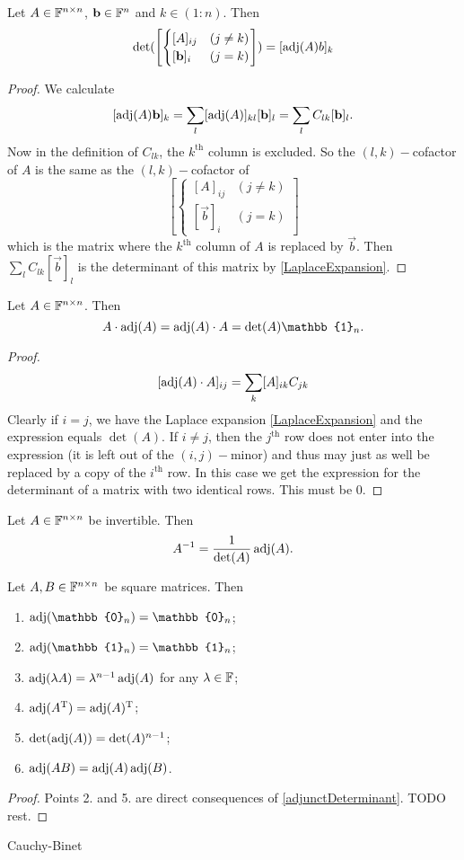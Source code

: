 \begin{lemma}
Let $A\in\mathbb{F}^{n\times n}$, $\boldsymbol{\mathrm{b}}\in \mathbb{F}^n$ and $k\in(1:n)$. Then
\[ \det(\left[\begin{cases}
[A]_{ij} & (j\neq k) \\
[\vec{b}]_i & (j=k)
\end{cases}\right]) = [\adj(A)b]_k \]
\end{lemma}
\begin{proof}
We calculate
\[ [\operatorname{adj}(A)\boldsymbol{\mathrm{b}}]_k = \sum_l [\operatorname{adj}(A)]_{kl}[\boldsymbol{\mathrm{b}}]_l = \sum_l C_{lk}[\boldsymbol{\mathrm{b}}]_l. \]
Now in the definition of $C_{lk}$, the $k^\text{th}$ column is excluded. So the $(l,k)-$cofactor of $A$ is the same as the $(l,k)-$cofactor of 
\[ \left[\begin{cases}
[A]_{ij} & (j\neq k) \\
[\vec{b}]_i & (j=k)
\end{cases}\right] \]
which is the matrix where the $k^\text{th}$ column of $A$ is replaced by $\vec{b}$. Then $\sum_l C_{lk}[\vec{b}]_l$ is the determinant of this matrix by \ref{LaplaceExpansion}.
\end{proof}

\begin{proposition} \label{adjunctDeterminant}
Let $A\in\mathbb{F}^{n\times n}$. Then
\[ A\cdot\adj(A) = \adj(A)\cdot A = \det(A) \mathbb{1}_n. \]
\end{proposition}
\begin{proof}
\[ [\operatorname{adj}(A)\cdot A]_{ij} = \sum_k [A]_{ik}C_{jk} \]
Clearly if $i=j$, we have the Laplace expansion \ref{LaplaceExpansion} and the expression equals $\det(A)$. If $i\neq j$, then the $j^\text{th}$ row does not enter into the expression (it is left out of the $(i,j)-$minor) and thus may just as well be replaced by a copy of the $i^\text{th}$ row. In this case we get the expression for the determinant of a matrix with two identical rows. This must be $0$.
\end{proof}
\begin{corollary}
Let $A\in\mathbb{F}^{n\times n}$ be invertible. Then
\[ A^{-1} = \frac{1}{\det(A)}\operatorname{adj}(A). \]
\end{corollary}

\begin{proposition}
Let $A,B\in\mathbb{F}^{n\times n}$ be square matrices. Then
\begin{enumerate}
\item $\adj(\mathbb{0}_n) = \mathbb{0}_n$;
\item $\adj(\mathbb{1}_n) = \mathbb{1}_n$;
\item $\operatorname{adj}(\lambda A) = \lambda^{n-1}\operatorname{adj}(A)$ for any $\lambda\in \mathbb{F}$;
\item $\operatorname{adj}(A^{\mathrm{T}}) = \operatorname{adj}(A)^{\mathrm{T}}$;
\item $\det(\operatorname{adj}(A)) = \det(A)^{n-1}$;
\item $\operatorname{adj}(AB) = \operatorname{adj}(A)\operatorname{adj}(B)$.
\end{enumerate}
\end{proposition}
\begin{proof}
Points 2. and 5. are direct consequences of \ref{adjunctDeterminant}. TODO rest.
\end{proof}
Cauchy-Binet

